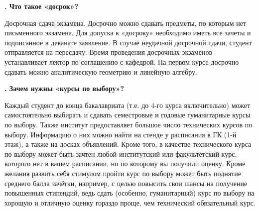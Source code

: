 \documentclass[14pt]{extarticle}
\newcounter{question}
\newcommand\Que[1]{%
    \begin{minipage}{\textwidth}
    \leavevmode\par
    \stepcounter{question}
    \noindent
    {\large\textbf{\thequestion. #1}}\par}
\newcommand\Ans[2][]{%
    \leavevmode\par\noindent
    {\leftskip37pt
    \textbf{#1}#2\par}
    \end{minipage}}
\begin{document}
\Que{Что такое «досрок»?}
\Ans{Досрочная сдача экзамена. Досрочно можно сдавать предметы, по которым нет письменного экзамена. Для допуска к «досроку» необходимо иметь все зачеты и подписанное в деканате заявление. В случае неудачной досрочной сдачи, студент отправляется на пересдачу. Время проведения досрочных экзаменов устанавливает лектор по соглашению с кафедрой. На первом курсе досрочно сдавать можно аналитическую геометрию и линейную алгебру.}

\Que{Зачем нужны «курсы по выбору»?}
\Ans{Каждый студент до конца бакалавриата (т.е. до 4-го курса включительно) может самостоятельно выбирать и сдавать семестровые и годовые гуманитарные курсы по выбору. Также институт предоставляет большое число технических курсов по выбору. Информацию о них можно найти на стенде у расписания в ГК (1-й этаж), а также на досках объявлений. Кроме того, в качестве технического курса по выбору может быть зачтен любой институтский или факультетский курс, которого нет в вашем расписании, но по которому вы получили оценку. Кроме желания развить себя стимулом пройти курс по выбору может быть поднятие среднего балла зачётки, например, с целью повысить свои шансы на получение повышенных стипендий, ведь сдать (особенно, гуманитарный) курс по выбору на хорошую и отличную оценку гораздо проще, чем технический обязательный курс.}
\end{document}
